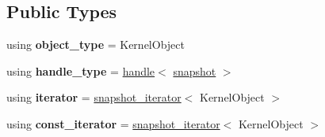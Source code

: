 \subsection*{Public Types}
\begin{DoxyCompactItemize}
\item 
\mbox{\label{classdistant_1_1kernel__objects_1_1snapshot_adedc8b82516c5fe51aa9a101ed0510db}} 
using {\bfseries object\+\_\+type} = Kernel\+Object
\item 
\mbox{\label{classdistant_1_1kernel__objects_1_1snapshot_a21acc69ce4300aad20f0a6a33aa09e66}} 
using {\bfseries handle\+\_\+type} = \mbox{\hyperlink{classdistant_1_1handle}{handle}}$<$ \mbox{\hyperlink{classdistant_1_1kernel__objects_1_1snapshot}{snapshot}} $>$
\item 
\mbox{\label{classdistant_1_1kernel__objects_1_1snapshot_ad354c24667f1204e85025da5b45c2354}} 
using {\bfseries iterator} = \mbox{\hyperlink{classdistant_1_1kernel__objects_1_1snapshot__iterator}{snapshot\+\_\+iterator}}$<$ Kernel\+Object $>$
\item 
\mbox{\label{classdistant_1_1kernel__objects_1_1snapshot_ae41a205d6d070f8b50242de623779ce0}} 
using {\bfseries const\+\_\+iterator} = \mbox{\hyperlink{classdistant_1_1kernel__objects_1_1snapshot__iterator}{snapshot\+\_\+iterator}}$<$ Kernel\+Object $>$
\end{DoxyCompactItemize}
